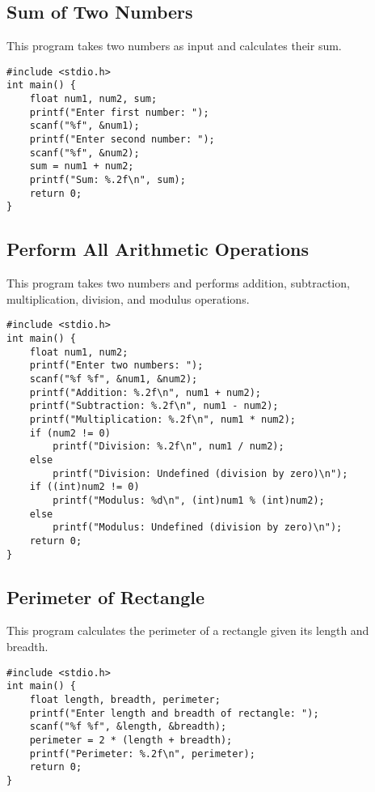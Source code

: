 \documentclass[a4paper,12pt]{article}
\begin{document}
\newpage

\subsection{Sum of Two Numbers}
This program takes two numbers as input and calculates their sum.

\begin{lstlisting}[caption={Sum of Two Numbers}]
#include <stdio.h>
int main() {
    float num1, num2, sum;
    printf("Enter first number: ");
    scanf("%f", &num1);
    printf("Enter second number: ");
    scanf("%f", &num2);
    sum = num1 + num2;
    printf("Sum: %.2f\n", sum);
    return 0;
}
\end{lstlisting}

\newpage

\subsection{Perform All Arithmetic Operations}
This program takes two numbers and performs addition, subtraction, multiplication, division, and modulus operations.

\begin{lstlisting}[caption={Perform All Arithmetic Operations}]
#include <stdio.h>
int main() {
    float num1, num2;
    printf("Enter two numbers: ");
    scanf("%f %f", &num1, &num2);
    printf("Addition: %.2f\n", num1 + num2);
    printf("Subtraction: %.2f\n", num1 - num2);
    printf("Multiplication: %.2f\n", num1 * num2);
    if (num2 != 0)
        printf("Division: %.2f\n", num1 / num2);
    else
        printf("Division: Undefined (division by zero)\n");
    if ((int)num2 != 0)
        printf("Modulus: %d\n", (int)num1 % (int)num2);
    else
        printf("Modulus: Undefined (division by zero)\n");
    return 0;
}
\end{lstlisting}

\newpage

\subsection{Perimeter of Rectangle}
This program calculates the perimeter of a rectangle given its length and breadth.

\begin{lstlisting}[caption={Perimeter of Rectangle}]
#include <stdio.h>
int main() {
    float length, breadth, perimeter;
    printf("Enter length and breadth of rectangle: ");
    scanf("%f %f", &length, &breadth);
    perimeter = 2 * (length + breadth);
    printf("Perimeter: %.2f\n", perimeter);
    return 0;
}
\end{lstlisting}
\end{document}

